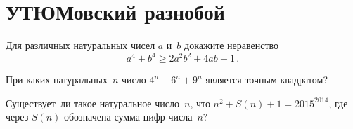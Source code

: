 
\section*{УТЮМовский разнобой}


\begin{problems}

\item
Для различных натуральных чисел $a$ и~$b$ докажите неравенство\enspace
\[
    a^4 + b^4
\geq
    2 a^2 b^2 + 4 a b + 1
\, . \]

\item
При каких натуральных~$n$ число $4^{n} + 6^{n} + 9^{n}$ является точным
квадратом?


\item
Существует~ли такое натуральное число~$n$, что $n^2 + S(n) + 1 = 2015^{2014}$,
где через $S(n)$ обозначена сумма цифр числа~$n$?


\end{problems}
